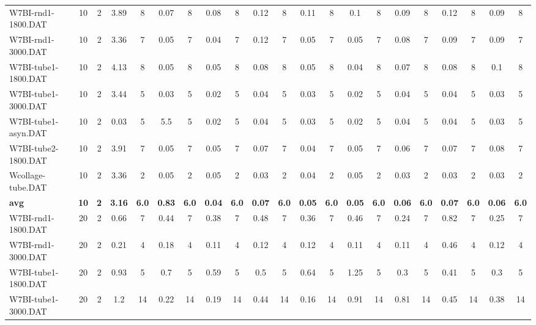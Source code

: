 \begin{sidewaystable}[!ht]
{\begin{tabular}{lcccccccccccccccccccc}
W7BI-rnd1-1800.DAT & 10 & 2 & 3.89 & 8 &  \textcolor{blue2}{0.07} & 8 & 0.08 & 8 & 0.12 & 8 & 0.11 & 8 & 0.1 & 8 & 0.09 & 8 & 0.12 & 8 & 0.09 & 8 \\
W7BI-rnd1-3000.DAT & 10 & 2 & 3.36 & 7 & 0.05 & 7 &  \textcolor{blue2}{0.04} & 7 & 0.12 & 7 & 0.05 & 7 & 0.05 & 7 & 0.08 & 7 & 0.09 & 7 & 0.09 & 7 \\
W7BI-tube1-1800.DAT & 10 & 2 & 4.13 & 8 & 0.05 & 8 & 0.05 & 8 & 0.08 & 8 & 0.05 & 8 &  \textcolor{blue2}{0.04} & 8 & 0.07 & 8 & 0.08 & 8 & 0.1 & 8 \\
W7BI-tube1-3000.DAT & 10 & 2 & 3.44 & 5 & 0.03 & 5 &  \textcolor{blue2}{0.02} & 5 & 0.04 & 5 & 0.03 & 5 &  \textcolor{blue2}{0.02} & 5 & 0.04 & 5 & 0.04 & 5 & 0.03 & 5 \\
W7BI-tube1-asyn.DAT & 10 & 2 & 0.03 & 5 & 5.5 & 5 &  \textcolor{blue2}{0.02} & 5 & 0.04 & 5 & 0.03 & 5 &  \textcolor{blue2}{0.02} & 5 & 0.04 & 5 & 0.04 & 5 & 0.03 & 5 \\
W7BI-tube2-1800.DAT & 10 & 2 & 3.91 & 7 & 0.05 & 7 & 0.05 & 7 & 0.07 & 7 &  \textcolor{blue2}{0.04} & 7 & 0.05 & 7 & 0.06 & 7 & 0.07 & 7 & 0.08 & 7 \\
Wcollage-tube.DAT & 10 & 2 & 3.36 & 2 & 0.05 & 2 & 0.05 & 2 &  \textcolor{blue2}{0.03} & 2 & 0.04 & 2 & 0.05 & 2 &  \textcolor{blue2}{0.03} & 2 &  \textcolor{blue2}{0.03} & 2 &  \textcolor{blue2}{0.03} & 2 \\
\cline{1-21} \textbf{avg} & \textbf{10} & \textbf{2} & \textbf{3.16} & \textbf{6.0} & \textbf{0.83} & \textbf{6.0} & \textbf{0.04} & \textbf{6.0} & \textbf{0.07} & \textbf{6.0} & \textbf{0.05} & \textbf{6.0} & \textbf{0.05} & \textbf{6.0} & \textbf{0.06} & \textbf{6.0} & \textbf{0.07} & \textbf{6.0} & \textbf{0.06} & \textbf{6.0} \\ \cline{1-21}
W7BI-rnd1-1800.DAT & 20 & 2 & 0.66 & 7 & 0.44 & 7 & 0.38 & 7 & 0.48 & 7 & 0.36 & 7 & 0.46 & 7 &  \textcolor{blue2}{0.24} & 7 & 0.82 & 7 & 0.25 & 7 \\
W7BI-rnd1-3000.DAT & 20 & 2 & 0.21 & 4 & 0.18 & 4 &  \textcolor{blue2}{0.11} & 4 & 0.12 & 4 & 0.12 & 4 &  \textcolor{blue2}{0.11} & 4 &  \textcolor{blue2}{0.11} & 4 & 0.46 & 4 & 0.12 & 4 \\
W7BI-tube1-1800.DAT & 20 & 2 & 0.93 & 5 & 0.7 & 5 & 0.59 & 5 & 0.5 & 5 & 0.64 & 5 & 1.25 & 5 &  \textcolor{blue2}{0.3} & 5 & 0.41 & 5 &  \textcolor{blue2}{0.3} & 5 \\
W7BI-tube1-3000.DAT & 20 & 2 & 1.2 & 14 & 0.22 & 14 & 0.19 & 14 & 0.44 & 14 &  \textcolor{blue2}{0.16} & 14 & 0.91 & 14 & 0.81 & 14 & 0.45 & 14 & 0.38 & 14 \\

\end{tabular}}
\end{sidewaystable}
